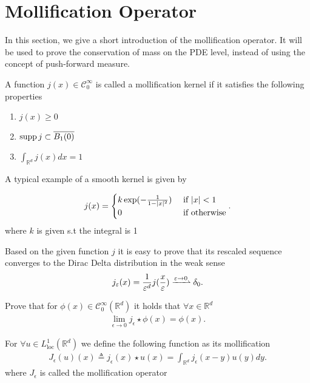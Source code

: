 \section{Mollification Operator}
In this section, we give a short introduction of the mollification operator. It will be used to prove the conservation of mass on the PDE level, instead of using the concept of push-forward measure.
\begin{definition}
A function $j(x) \in  \mathcal{C}_0^{\infty} $ is called a mollification kernel  if it satisfies
the following properties
\begin{enumerate}
  \item $j(x) \ge 0$  
  \item $\operatorname*{supp} j \subset  \overline{B_1(0)}  $
  \item $\int_{\mathbb{R}^{d} } j(x) dx = 1$
\end{enumerate} 
\end{definition}
\vskip5mm
A typical example of a smooth kernel is  given by 
\begin{example}
 \begin{align*}
   j(x) = \begin{cases}
     k \exp(-\frac{1}{1-\lvert x\rvert^2}) &\text{ if } \lvert x\rvert < 1 \\
     0 &\text{ if } \text{otherwise}
   \end{cases} 
 .\end{align*}
 where $k$ is given s.t the integral is 1 
\end{example}
\begin{remark}
 Based on the given function $j$ it is easy to prove that its rescaled sequence converges to 
 the Dirac Delta distribution in the weak sense 
 \begin{align*}
   j_{\epsilon}(x) = \frac{1}{\epsilon^d}j(\frac{x}{\epsilon}) \xrightharpoonup{\epsilon \to 0} \delta_0
 .\end{align*}
\end{remark}
\begin{exercise}
 Prove that for $\phi(x) \in  \mathcal{C}_0^{\infty}(\mathbb{R}^{d} ) $  it holds that $\forall x \in  \mathbb{R}^{d} $
 \begin{align*}
   \lim_{\epsilon \to 0}j_{\epsilon} \star \phi(x) = \phi(x)
 .\end{align*}
\end{exercise}
\begin{definition}\label{mollification_operator}
  For $\forall u \in  L_{\text{loc}}^{1}(\mathbb{R}^{d} ) $  we define the following function as its mollification 
  \begin{align*}
    J_{\epsilon}(u)(x) \triangleq j_{\epsilon}(x) \star u(x) = \int_{\mathbb{R}^{d} }j_{\epsilon}(x-y)u(y)dy
  .\end{align*}
  where $J_{\epsilon}$ is called the mollification operator
\end{definition}
